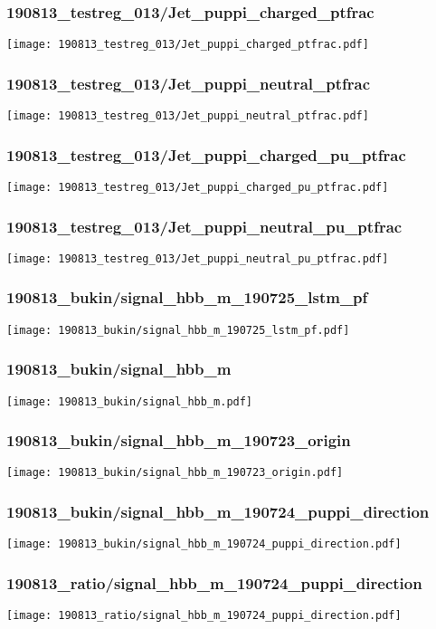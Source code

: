 \begin{frame}
   \frametitle{\small 190813\_testreg\_013/Jet\_puppi\_charged\_ptfrac}
   \centering
   \texttt{[image: 190813\_testreg\_013/Jet\_puppi\_charged\_ptfrac.pdf]}
\end{frame}

\begin{frame}
   \frametitle{\small 190813\_testreg\_013/Jet\_puppi\_neutral\_ptfrac}
   \centering
   \texttt{[image: 190813\_testreg\_013/Jet\_puppi\_neutral\_ptfrac.pdf]}
\end{frame}

\begin{frame}
   \frametitle{\small 190813\_testreg\_013/Jet\_puppi\_charged\_pu\_ptfrac}
   \centering
   \texttt{[image: 190813\_testreg\_013/Jet\_puppi\_charged\_pu\_ptfrac.pdf]}
\end{frame}

\begin{frame}
   \frametitle{\small 190813\_testreg\_013/Jet\_puppi\_neutral\_pu\_ptfrac}
   \centering
   \texttt{[image: 190813\_testreg\_013/Jet\_puppi\_neutral\_pu\_ptfrac.pdf]}
\end{frame}

\begin{frame}
   \frametitle{\small 190813\_bukin/signal\_hbb\_m\_190725\_lstm\_pf}
   \centering
   \texttt{[image: 190813\_bukin/signal\_hbb\_m\_190725\_lstm\_pf.pdf]}
\end{frame}

\begin{frame}
   \frametitle{\small 190813\_bukin/signal\_hbb\_m}
   \centering
   \texttt{[image: 190813\_bukin/signal\_hbb\_m.pdf]}
\end{frame}

\begin{frame}
   \frametitle{\small 190813\_bukin/signal\_hbb\_m\_190723\_origin}
   \centering
   \texttt{[image: 190813\_bukin/signal\_hbb\_m\_190723\_origin.pdf]}
\end{frame}

\begin{frame}
   \frametitle{\small 190813\_bukin/signal\_hbb\_m\_190724\_puppi\_direction}
   \centering
   \texttt{[image: 190813\_bukin/signal\_hbb\_m\_190724\_puppi\_direction.pdf]}
\end{frame}

\begin{frame}
   \frametitle{\small 190813\_ratio/signal\_hbb\_m\_190724\_puppi\_direction}
   \centering
   \texttt{[image: 190813\_ratio/signal\_hbb\_m\_190724\_puppi\_direction.pdf]}
\end{frame}

